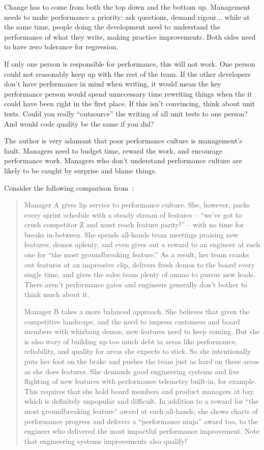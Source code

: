 \documentclass[a4paper]{report}
\begin{document}
Change has to come from both the top down and the bottom up. Management needs to make performance a priority: ask questions, demand rigour... while at the same time, people doing the development need to understand the performance of what they write, making practice improvements. Both sides need to have zero tolerance for regression.

If only one person is responsible for performance, this will not work. One person could not reasonably keep up with the rest of the team. If the other developers don't have performance in mind when writing, it would mean the key performance person would spend unnecessary time rewriting things when the it could have been right in the first place. If this isn't convincing, think about unit tests. Could you really ``outsource'' the writing of all unit tests to one person? And would code quality be the same if you did?

The author is very adamant that poor performance culture is management's fault. Managers need to budget time, reward the work, and encourage performance work. Managers who don't understand performance culture are likely to be caught by surprise and blame things. 

Consider the following comparison from~\cite{perfculture}:

\begin{quote}
Manager A gives lip service to performance culture. She, however, packs every sprint schedule with a steady stream of features -- ``we've got to crush competitor Z and must reach feature parity!'' -- with no time for breaks in-between. She spends all-hands team meetings praising new features, demos aplenty, and even gives out a reward to an engineer at each one for ``the most groundbreaking feature.'' As a result, her team cranks out features at an impressive clip, delivers fresh demos to the board every single time, and gives the sales team plenty of ammo to pursue new leads. There aren't performance gates and engineers generally don't bother to think much about it.

Manager B takes a more balanced approach. She believes that given the competitive landscape, and the need to impress customers and board members with whizbang demos, new features need to keep coming. But she is also wary of building up too much debt in areas like performance, reliability, and quality for areas she expects to stick. So she intentionally puts her foot on the brake and pushes the team just as hard on these areas as she does features. She demands good engineering systems and live flighting of new features with performance telemetry built-in, for example. This requires that she hold board members and product managers at bay, which is definitely unpopular and difficult. In addition to a reward for ``the most groundbreaking feature'' award at each all-hands, she shows charts of performance progress and delivers a ``performance ninja'' award too, to the engineer who delivered the most impactful performance improvement. Note that engineering systems improvements also qualify!
\end{quote}
\end{document}
